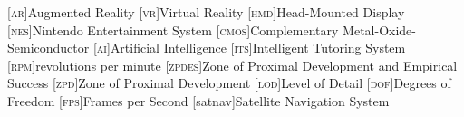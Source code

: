 \newcommand{\pval}[1]{$p$\,=\,#1}



[\textsc{ar}]{Augmented Reality}
[\textsc{vr}]{Virtual Reality}
[\textsc{hmd}]{Head-Mounted Display}
[\textsc{nes}]{Nintendo Entertainment System}
[\textsc{cmos}]{Complementary Metal-Oxide-Semiconductor}
[\textsc{ai}]{Artificial Intelligence}
[\textsc{its}]{Intelligent Tutoring System}
[\textsc{rpm}]{revolutions per minute}
[\textsc{zpdes}]{Zone of Proximal Development and Empirical Success}
[\textsc{zpd}]{Zone of Proximal Development}
[\textsc{lod}]{Level of Detail}
[\textsc{dof}]{Degrees of Freedom}
[\textsc{fps}]{Frames per Second}
[satnav]{Satellite Navigation System}

\newcommand{\refsec}[1]{Section~\ref{sec:#1}}
\newcommand{\refeq}[1]{Eq.~(\ref{eq:#1})}
\newcommand{\reffig}[1]{Figure~\ref{fig:#1}}
\newcommand{\reftab}[1]{Table~\ref{tab:#1}}
\newcommand{\refalg}[1]{Alg.~(\ref{alg:#1})}


\newcommand{\todo}[1]{\textcolor{red}{TODO: #1}}